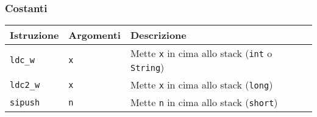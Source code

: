 \subsubsection*{Costanti}
\label{sec:costanti}
{\footnotesize
\begin{longtable}{p{2cm} p{2cm} p{6.5cm}}
\toprule
\rowcolor[gray]{0.9}
  \textbf{Istruzione} &
  \textbf{Argomenti} &
  \textbf{Descrizione} \\
\toprule
\endhead
  \texttt{ldc\_w} &
  \texttt{x} &
  Mette \texttt{x} in cima allo stack (\texttt{int} o \texttt{String})  \\
  
  \texttt{ldc2\_w} &
  \texttt{x} &
  Mette \texttt{x} in cima allo stack (\texttt{long})  \\
  
  \texttt{sipush} &
  \texttt{n} &
  Mette \texttt{n} in cima allo stack (\texttt{short})  \\
\bottomrule
\end{longtable}
} %

